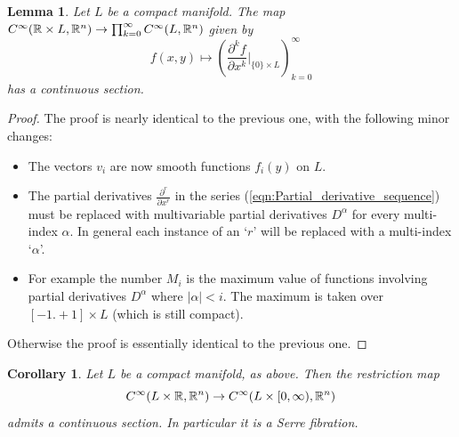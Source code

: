 \documentclass{article}
\newtheorem{lemma}[theorem]{Lemma}
\newtheorem{corollary}[theorem]{Corollary}
\newtheorem{proposed work}[theorem]{Proposed Work}
\begin{document}
\begin{lemma} \label{lma:Extend_Derivatives_to_function}
	Let $L$ be a compact manifold. The map $C^\infty(\mathbb R \times L, \mathbb R^n) \to \prod_{k=0}^\infty C^\infty(L, \mathbb R^n)$ given by
	\begin{equation*}
		f(x,y) \mapsto \left( \frac{\partial^k f}{\partial x^k}  |_{\{0\}\times L} \right)_{k=0}^\infty
	\end{equation*}
	has a continuous section. 
\end{lemma}

\begin{proof}
	The proof is nearly identical to the previous one, with the following minor changes:
	\begin{itemize}
		\item The vectors $v_i$ are now smooth functions $f_i(y)$ on $L$. 
		\item The partial derivatives $\frac{\partial^r}{\partial x^r}$ in the series (\ref{eqn:Partial_derivative_sequence}) must be replaced with multivariable partial derivatives $D^\alpha$ for every multi-index $\alpha$. In general each instance of an `$r$' will be replaced with a multi-index `$\alpha$'.
		\item For example the number $M_i$ is the maximum value of functions involving partial derivatives $D^\alpha$ where $|\alpha| < i$. The maximum is taken over $[-1.+1] \times L$ (which is still compact).  
	\end{itemize}
	Otherwise the proof is essentially identical to the previous one. 
\end{proof}

\begin{corollary} \label{cor:Compact_extension_of_function}
	Let $L$ be a compact manifold, as above. Then the restriction map 
	\begin{equation*}
		C^\infty(L \times \mathbb R, \mathbb R^n) \to C^\infty(L \times [0,\infty), \mathbb R^n)
	\end{equation*}
	admits a continuous section. In particular it is a Serre fibration. 
\end{corollary}
\end{document}
